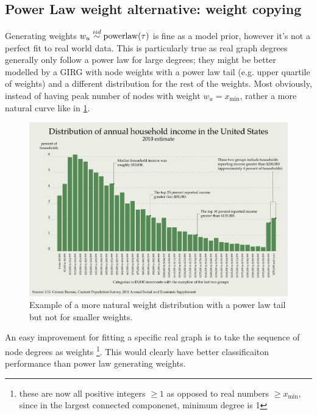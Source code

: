 \subsection{Power Law weight alternative: weight copying}
Generating weights $w_u \stackrel{iid}{\sim} \operatorname{powerlaw}(\tau)$ is fine as a model prior, however it's not a perfect fit to real world data. This is particularly true as real graph degrees generally only follow a power law for large degrees; they might be better modelled by a GIRG with node weights with a power law tail (e.g. upper quartile of weights) and a different distribution for the rest of the weights. Most obviously, instead of having peak number of nodes with weight $w_u = x_{\min}$, rather a more natural curve like in \cref{fig:natural_weight_distribution}.


\begin{figure}
    \centering
    \includegraphics[width=\textwidth]{./figures/Distribution_of_Annual_Household_Income_in_the_United_States_2010.png}
    \caption{Example of a more natural weight distribution with a power law tail but not for smaller weights.}
    \label{fig:natural_weight_distribution}
\end{figure}


An easy improvement for fitting a specific real graph is to take the sequence of node degrees as weights
\footnote{these are now all positive integers $\geq 1$ as opposed to real numbers $\geq x_{\min}$, since in the largest connected componenet, minimum degree is 1}.
This would clearly have better classificaiton performance than power law generating weights.

